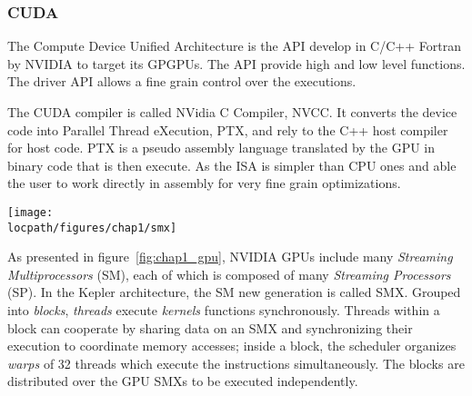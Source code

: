 \subsubsection{CUDA}
\label{sec:CUDA}
The Compute Device Unified Architecture is the API develop in C/C++ Fortran by NVIDIA to target its GPGPUs. 
The API provide high and low level functions. 
The driver API allows a fine grain control over the executions.

The CUDA compiler is called NVidia C Compiler, NVCC. 
It converts the device code into Parallel Thread eXecution, PTX, and rely to the C++ host compiler for host code. 
PTX is a pseudo assembly language translated by the GPU in binary code that is then execute. 
As the ISA is simpler than CPU ones and able the user to work directly in assembly for very fine grain optimizations. 

\begin{figure*}[t!]
\centering
\setlength\fboxsep{0pt}
\setlength\fboxrule{0.25pt}
\texttt{[image: \\locpath/figures/chap1/smx]}
\caption{NVIDIA GPU and CUDA architecture overview}
 \label{fig:chap1_gpu}
\end{figure*}

As presented in figure~\ref{fig:chap1_gpu}, NVIDIA GPUs include many \emph{Streaming Multiprocessors} (SM), each of which is composed of many \emph{Streaming Processors} (SP). In the Kepler architecture, the SM new generation is called SMX.
%
Grouped into \emph{blocks}, \textit{threads} execute \emph{kernels} functions synchronously.
Threads within a block can cooperate by sharing data on an SMX and synchronizing their execution to coordinate memory accesses; inside a block, the scheduler organizes \emph{warps} of 32 threads which execute the instructions simultaneously.
The blocks are distributed over the GPU SMXs to be executed independently.


